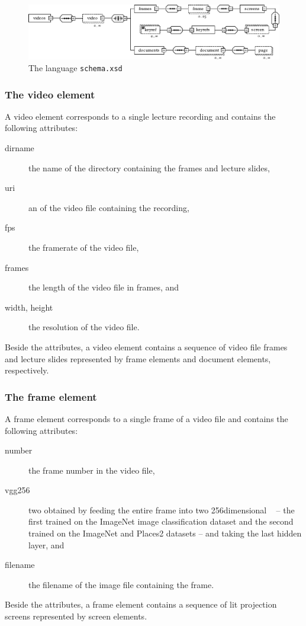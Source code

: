 \begin{figure}
  \leavevmode{}\textwidth
  \includegraphics[width=1.4\textwidth]{fig/structure/schema}
  \caption{The  language \texttt{schema.xsd} }
  \label{fig:schema}
\end{figure}

\subsubsection*{The video element}
A video element corresponds to a single lecture recording and contains the
following attributes:
\begin{description}
  \item[dirname] the name of the directory containing the frames and lecture slides,
  \item[uri] an  of the video file containing the recording,
  \item[fps] the framerate of the video file,
  \item[frames] the length of the video file in frames, and
  \item[width\textmd, height] the resolution of the video file.
\end{description}
Beside the attributes, a video element contains a sequence of video file frames
and lecture slides represented by frame elements and document elements,
respectively.

\subsubsection*{The frame element}
A frame element corresponds to a single frame of a video file and contains the
following attributes:
\begin{description}
  \item[number] the frame number in the video file,
  \item[vgg256] two  obtained by feeding the
    entire frame into two 256dimensional ~\cite{simonyan2014very} -- the first trained on the ImageNet%
     image
    classification dataset and the second trained on the ImageNet and
    Places2
    datasets -- and taking the last hidden layer, and
  \item[filename] the filename of the image file containing the frame.
\end{description}
Beside the attributes, a frame element contains a sequence of lit projection
screens represented by screen elements.

